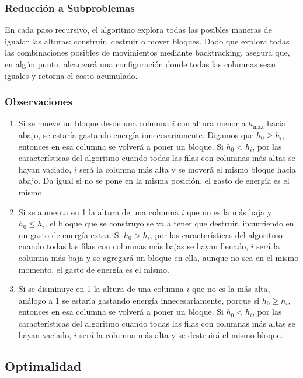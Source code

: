 \documentclass[a4paper,12pt]{article}
\begin{document}
\subsubsection{Reducción a Subproblemas}
En cada paso recursivo, el algoritmo explora todas las posibles maneras de igualar las alturas: construir, destruir o mover bloques. Dado que explora todas las combinaciones posibles de movimientos mediante backtracking, asegura que, en algún punto, alcanzará una configuración donde todas las columnas sean iguales y retorna el costo acumulado.

\subsubsection{Observaciones}
\begin{enumerate}
	\item Si se mueve un bloque desde una columna \( i \) con altura menor a \( h_{\text{max}} \) hacia abajo, se estaría gastando energía innecesariamente. Digamos que \( h_0 \geq h_i \), entonces en esa columna se volverá a poner un bloque. Si \( h_0 < h_i \), por las características del algoritmo cuando todas las filas con columnas más altas se hayan vaciado, \( i \) será la columna más alta y se moverá el mismo bloque hacia abajo. Da igual si no se pone en la misma posición, el gasto de energía es el mismo.
	\item Si se aumenta en 1 la altura de una columna \( i \) que no es la más baja y \( h_0 \leq h_i \), el bloque que se construyó se va a tener que destruir, incurriendo en un gasto de energía extra. Si \( h_0 > h_i \), por las características del algoritmo cuando todas las filas con columnas más bajas se hayan llenado, \( i \) será la columna más baja y se agregará un bloque en ella, aunque no sea en el mismo momento, el gasto de energía es el mismo.
	\item Si se disminuye en 1 la altura de una columna \( i \) que no es la más alta, análogo a 1 se estaría gastando energía innecesariamente, porque si \( h_0 \geq h_i \), entonces en esa columna se volverá a poner un bloque. Si \( h_0 < h_i \), por las características del algoritmo cuando todas las filas con columnas más altas se hayan vaciado, \( i \) será la columna más alta y se destruirá el mismo bloque.
\end{enumerate}


\subsection{Optimalidad}
\end{document}
